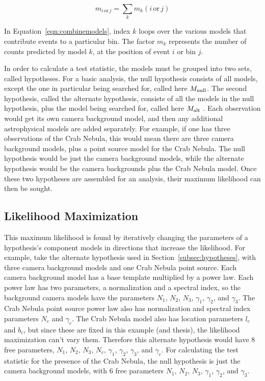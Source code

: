   \begin{equation}\label{eqn:combinemodels}
    m_{i\,\textrm{or}\,j} = \sum_k m_k(i\,\textrm{or}\,j)
  \end{equation}

  In Equation~\ref{eqn:combinemodels}, index $k$ loops over the various models that contribute events to a particular bin.
  The factor $m_k$ represents the number of counts predicted by model $k$, at the position of event $i$ or bin $j$.
  
  In order to calculate a test statistic, the models must be grouped into two sets, called hypotheses.
  For a basic analysis, the null hypothesis consists of all models, except the one in particular being searched for, called here $M_\textrm{null}$.
  The second hypothesis, called the alternate hypothesis, consists of all the models in the null hypothesis, plus the model being searched for, called here $M_\textrm{alt }$.
  Each observation would get its own camera background model, and then any additional astrophysical models are added separately.
  For example, if one has three observations of the Crab Nebula, this would mean there are three camera background models, plus a point source model for the Crab Nebula.
  The null hypothesis would be just the camera background models, while the alternate hypothesis would be the camera backgrounds plus the Crab Nebula model.
  Once these two hypotheses are assembled for an analysis, their maximum likelihood can then be sought.
  
  \subsection{Likelihood Maximization}\label{subsec:likemax}
  This maximum likelihood is found by iteratively changing the parameters of a hypothesis's component models in directions that increase the likelihood.
  For example, take the alternate hypothesis used in Section~\ref{subsec:hypotheses}, with three camera background models and one Crab Nebula point source.
  Each camera background model has a base template multiplied by a power law.
  Each power law has two parameters, a normalization and a spectral index, so the background camera models have the parameters $N_1$, $N_2$, $N_3$, $\gamma_1$, $\gamma_2$, and $\gamma_3$.
  The Crab Nebula point source power law also has normalization and spectral index parameters $N_c$ and $\gamma_c$.
  The Crab Nebula model also has location parameters $l_c$ and $b_c$, but since these are fixed in this example (and thesis), the likelihood maximization can't vary them.
  Therefore this alternate hypothesis would have 8 free parameters, $N_1$, $N_2$, $N_3$, $N_c$, $\gamma_1$, $\gamma_2$, $\gamma_3$, and $\gamma_c$.
  For calculating the test statistic for the presence of the Crab Nebula, the null hypothesis is just the camera background models, with 6 free parameters $N_1$, $N_2$, $N_3$, $\gamma_1$, $\gamma_2$, and $\gamma_3$.
  
